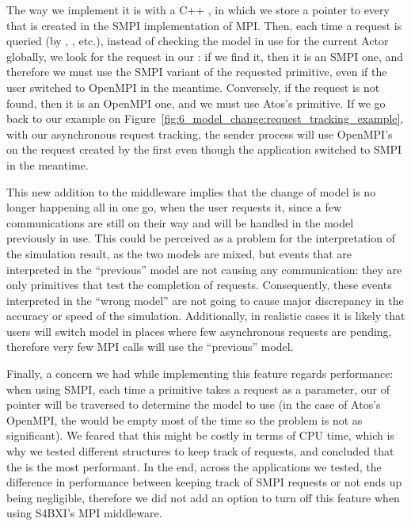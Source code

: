 The way we implement it is with a C++ , in which we store a
pointer to every  that is created in the SMPI implementation
of MPI. Then, each time a request is queried (by ,
, etc.), instead of checking the model in use for the current
Actor globally, we look for the request in our : if we
find it, then it is an SMPI one, and therefore we must use the SMPI variant of
the requested primitive, even if the user switched to OpenMPI in the meantime.
Conversely, if the request is not found, then it is an OpenMPI one, and we must
use Atos's primitive. If we go back to our example on
Figure~\ref{fig:6_model_change:request_tracking_example}, with our asynchronous
request tracking, the sender process will use OpenMPI's  on the
request created by the first  even though the application
switched to SMPI in the meantime.

This new addition to the middleware implies that the change of model is no
longer happening all in one go, when the user requests it, since a few
communications are still on their way and will be handled in the model
previously in use. This could be perceived as a problem for the interpretation
of the simulation result, as the two models are mixed, but events that are
interpreted in the ``previous'' model are not  causing any communication: they
are only primitives that test the completion of requests. Consequently, these
events interpreted in the ``wrong model'' are not going to cause major
discrepancy in the accuracy or speed of the simulation. Additionally, in
realistic cases it is likely that users will switch model in places where few
asynchronous requests are pending, therefore very few MPI calls will use the
``previous'' model.

Finally, a concern we had while implementing this feature regards performance:
when using SMPI, each time a primitive takes a request as a parameter, our
 of pointer will be traversed to determine the model to
use (in the case of Atos's OpenMPI, the  would be empty
most of the time so the problem is not as significant). We feared that this
might be costly in terms of CPU time, which is why we tested different
structures to keep track of requests, and concluded that the
 is the most performant. In the end, across the
applications we tested, the difference in performance between keeping track of
SMPI requests or not ends up being negligible, therefore we did not add an
option to turn off this feature when using S4BXI's MPI middleware.

